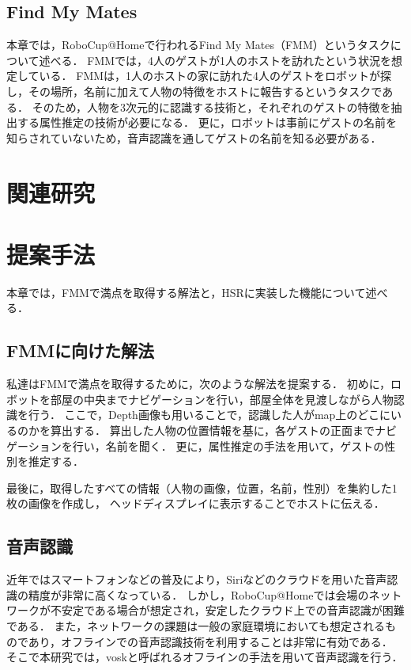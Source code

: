 \documentclass[a4j]{jarticle}
\begin{document}
\subsection{Find My Mates}
本章では，RoboCup@Homeで行われるFind My Mates（FMM）というタスクについて述べる．
FMMでは，4人のゲストが1人のホストを訪れたという状況を想定している．
FMMは，1人のホストの家に訪れた4人のゲストをロボットが探し，その場所，名前に加えて人物の特徴をホストに報告するというタスクである．
そのため，人物を3次元的に認識する技術と，それぞれのゲストの特徴を抽出する属性推定の技術が必要になる．
更に，ロボットは事前にゲストの名前を知らされていないため，音声認識を通してゲストの名前を知る必要がある．


\section{関連研究}


\section{提案手法}
本章では，FMMで満点を取得する解法と，HSRに実装した機能について述べる．

\subsection{FMMに向けた解法}
私達はFMMで満点を取得するために，次のような解法を提案する．
初めに，ロボットを部屋の中央までナビゲーションを行い，部屋全体を見渡しながら人物認識を行う．
ここで，Depth画像も用いることで，認識した人がmap上のどこにいるのかを算出する．
算出した人物の位置情報を基に，各ゲストの正面までナビゲーションを行い，名前を聞く．
更に，属性推定の手法を用いて，ゲストの性別を推定する．

最後に，取得したすべての情報（人物の画像，位置，名前，性別）を集約した1枚の画像を作成し，
ヘッドディスプレイに表示することでホストに伝える．

\subsection{音声認識}
近年ではスマートフォンなどの普及により，Siriなどのクラウドを用いた音声認識の精度が非常に高くなっている．
しかし，RoboCup@Homeでは会場のネットワークが不安定である場合が想定され，安定したクラウド上での音声認識が困難である．
また，ネットワークの課題は一般の家庭環境においても想定されるものであり，オフラインでの音声認識技術を利用することは非常に有効である．
そこで本研究では，vosk\cite{vosk_hp}と呼ばれるオフラインの手法を用いて音声認識を行う．
\end{document}
